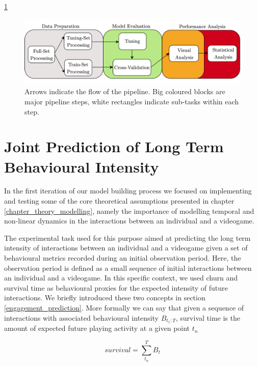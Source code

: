 \ref{fig: pipeline_eval}
\begin{figure}[h]
  \centering
  \includegraphics[width=\textwidth]{images/chapter_3/pipeline_eval.png}
    \caption[\textbf{Model implementation experimental pipeline}]{Arrows indicate the flow of the pipeline. Big coloured blocks are major pipeline steps, white rectangles indicate sub-tasks within each step.}
    \label{fig: pipeline_eval}
\end{figure}

\section{Joint Prediction of Long Term Behavioural Intensity}
\label{model_architecture_1}
In the first iteration of our model building process we focused on implementing and testing some of the core theoretical assumptions presented in chapter \ref{chapter_theory_modelling}, namely the importance of modelling temporal and non-linear dynamics in the interactions between an individual and a videogame. 

The experimental task used for this purpose aimed at predicting the long term intensity of interactions between an individual and a videogame given a set of behavioural metrics recorded during an initial observation period. Here, the observation period is defined as a small sequence of initial interactions between an individual and a videogame. In this specific context, we used churn and survival time as behavioural proxies for the expected intensity of future interactions. We briefly introduced these two concepts in section \ref{engagement_prediction}. More formally we can say that given a sequence of interactions with associated behavioural intensity $B_{t_1 : T}$, survival time is the amount of expected future playing activity at a given point $t_n$ \cite{ perianez2016churn, demediuk2018player, bertens2017games, kim2017churn, viljanen2018playtime}

\begin{equation}
\label{eq_survival}
    survival = \sum_{t_n}^{T}B_t
\end{equation}

